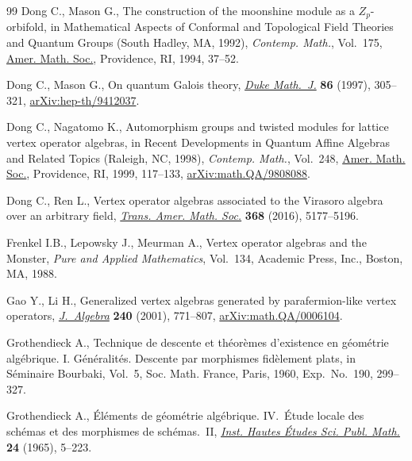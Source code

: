 \documentclass[11pt]{article}
\theoremstyle{definition}
\begin{document}
\begin{thebibliography}{99}
Dong C., Mason G., The construction of the moonshine module as a
 {$Z_p$}-orbifold, in Mathematical Aspects of Conformal and Topological Field
 Theories and Quantum Groups ({S}outh {H}adley, {MA}, 1992), \textit{Contemp.
 Math.}, Vol.~175, \href{https://doi.org/10.1090/conm/175/01836}{Amer. Math. Soc.}, Providence, RI, 1994, 37--52.

Dong C., Mason G., On quantum {G}alois theory, \href{https://doi.org/10.1215/S0012-7094-97-08609-9}{\textit{Duke Math.~J.}}
 \textbf{86} (1997), 305--321, \href{https://arxiv.org/abs/hep-th/9412037}{arXiv:hep-th/9412037}.

Dong C., Nagatomo K., Automorphism groups and twisted modules for lattice
 vertex operator algebras, in Recent Developments in Quantum Affine Algebras
 and Related Topics ({R}aleigh, {NC}, 1998), \textit{Contemp. Math.}, Vol.~248, \href{https://doi.org/10.1090/conm/248/03821}{Amer. Math. Soc.}, Providence, RI, 1999, 117--133,
 \href{https://arxiv.org/abs/math.QA/9808088}{arXiv:math.QA/9808088}.

Dong C., Ren L., Vertex operator algebras associated to the {V}irasoro algebra
 over an arbitrary field, \href{https://doi.org/10.1090/tran/6529}{\textit{Trans. Amer. Math. Soc.}} \textbf{368}
 (2016), 5177--5196.

Frenkel I.B., Lepowsky J., Meurman A., Vertex operator algebras and the
 {M}onster, \textit{Pure and Applied Mathematics}, Vol.~134, Academic Press,
 Inc., Boston, MA, 1988.

Gao Y., Li H., Generalized vertex algebras generated by parafermion-like vertex
 operators, \href{https://doi.org/10.1006/jabr.2001.8754}{\textit{J.~Algebra}} \textbf{240} (2001), 771--807,
 \href{https://arxiv.org/abs/math.QA/0006104}{arXiv:math.QA/0006104}.

Grothendieck A., Technique de descente et th\'{e}or\`emes d'existence en
 g\'{e}om\'{e}trie alg\'{e}brique. {I}. {G}\'{e}n\'{e}ralit\'{e}s. {D}escente
 par morphismes fid\`element plats, in S\'{e}minaire {B}ourbaki, {V}ol.~5,
 Soc. Math. France, Paris, 1960, Exp.~No.~190, 299--327.

Grothendieck A., \'{E}l\'{e}ments de g\'{e}om\'{e}trie alg\'{e}brique.
 {IV}.~\'{E}tude locale des sch\'{e}mas et des morphismes de
 sch\'{e}mas.~{II}, \href{https://doi.org/10.1007/BF02684322}{\textit{Inst. Hautes \'{E}tudes Sci. Publ. Math.}}
 \textbf{24} (1965), 5--223.


\end{thebibliography}
\end{document}
